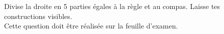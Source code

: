 %
%
    Divise la droite en 5 parties égales à la règle et au compas. Laisse tes constructions visibles.\\
    Cette question doit être réalisée sur la feuille d'examen.
    \begin{center}
        
    \end{center}
